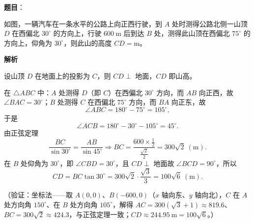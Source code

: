 \begin{answer}

\textbf{题目}：

如图，一辆汽车在一条水平的公路上向正西行驶，到 \(A\) 处时测得公路北侧一山顶 \(D\) 在西偏北 \(30^\circ\) 的方向上，行驶 \(600\ \mathrm{m}\) 后到达 \(B\) 处，测得此山顶在西偏北 \(75^\circ\) 的方向上，仰角为 \(30^\circ\)，则此山的高度 \(CD=\)\gkblank{}\(\mathrm{m}\)。
\nopagebreak[4]
\begin{center}\end{center}
\nopagebreak[4]
\textbf{解析}

设山顶 \(D\) 在地面上的投影为 \(C\)，则 \(CD\perp\) 地面，\(CD\) 即山高。

在 \(\triangle ABC\) 中：\(A\) 处测得 \(D\)（即 \(C\)）在西偏北 \(30^\circ\) 方向，而 \(AB\) 向正西，故 \(\angle BAC=30^\circ\)；\(B\) 处测得 \(C\) 在西偏北 \(75^\circ\) 方向，而 \(BA\) 向正东，故
\nopagebreak[4]
\[
\angle ABC=180^\circ-75^\circ=105^\circ,
\]
于是
\nopagebreak[4]
\[
\angle ACB=180^\circ-30^\circ-105^\circ=45^\circ.
\]
由正弦定理
\nopagebreak[4]
\[
\dfrac{BC}{\sin30^\circ}=\dfrac{AB}{\sin45^\circ}
\Longrightarrow
BC=\dfrac{600\times\frac12}{\frac{\sqrt2}{2}}=300\sqrt2\ (\mathrm{m}).
\]
在 \(B\) 处仰角为 \(30^\circ\)，即 \(\angle CBD=30^\circ\)，且 \(CD\perp\) 地面故 \(\angle BCD=90^\circ\)，所以
\nopagebreak[4]
\[
CD=BC\tan30^\circ=300\sqrt2\cdot\dfrac{\sqrt3}{3}=100\sqrt6\ (\mathrm{m}).
\]

（验证：坐标法——取 \(A(0,0)\)、\(B(-600,0)\)（\(x\) 轴向东、\(y\) 轴向北），\(C\) 在 \(A\) 处方向角 \(150^\circ\)、在 \(B\) 处方向角 \(105^\circ\)，解得 \(AC=300(\sqrt3+1)\approx819.6\)、\(BC=300\sqrt2\approx424.3\)，与正弦定理一致；\(CD\approx244.95\ \mathrm{m}=100\sqrt6\)。）


\end{answer}
